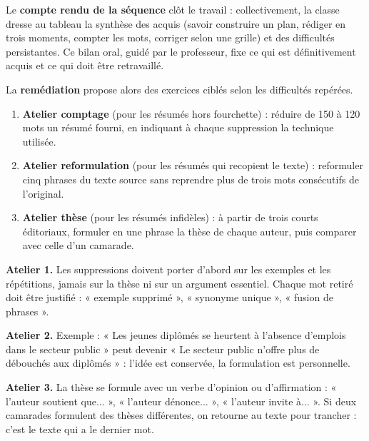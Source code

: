 \documentclass[11pt]{article}
\begin{document}
Le \textbf{compte rendu de la séquence} clôt le travail : collectivement, la classe dresse au tableau la synthèse des acquis (savoir construire un plan, rédiger en trois moments, compter les mots, corriger selon une grille) et des difficultés persistantes. Ce bilan oral, guidé par le professeur, fixe ce qui est définitivement acquis et ce qui doit être retravaillé.

La \textbf{remédiation} propose alors des exercices ciblés selon les difficultés repérées.

\begin{exercice}
\begin{enumerate}
\item \textbf{Atelier comptage} (pour les résumés hors fourchette) : réduire de 150 à 120 mots un résumé fourni, en indiquant à chaque suppression la technique utilisée.
\item \textbf{Atelier reformulation} (pour les résumés qui recopient le texte) : reformuler cinq phrases du texte source sans reprendre plus de trois mots consécutifs de l'original.
\item \textbf{Atelier thèse} (pour les résumés infidèles) : à partir de trois courts éditoriaux, formuler en une phrase la thèse de chaque auteur, puis comparer avec celle d'un camarade.
\end{enumerate}
\end{exercice}

\begin{corrige}
\textbf{Atelier 1.} Les suppressions doivent porter d'abord sur les exemples et les répétitions, jamais sur la thèse ni sur un argument essentiel. Chaque mot retiré doit être justifié : « exemple supprimé », « synonyme unique », « fusion de phrases ».

\textbf{Atelier 2.} Exemple : « Les jeunes diplômés se heurtent à l'absence d'emplois dans le secteur public » peut devenir « Le secteur public n'offre plus de débouchés aux diplômés » : l'idée est conservée, la formulation est personnelle.

\textbf{Atelier 3.} La thèse se formule avec un verbe d'opinion ou d'affirmation : « l'auteur soutient que... », « l'auteur dénonce... », « l'auteur invite à... ». Si deux camarades formulent des thèses différentes, on retourne au texte pour trancher : c'est le texte qui a le dernier mot.
\end{corrige}
\end{document}
